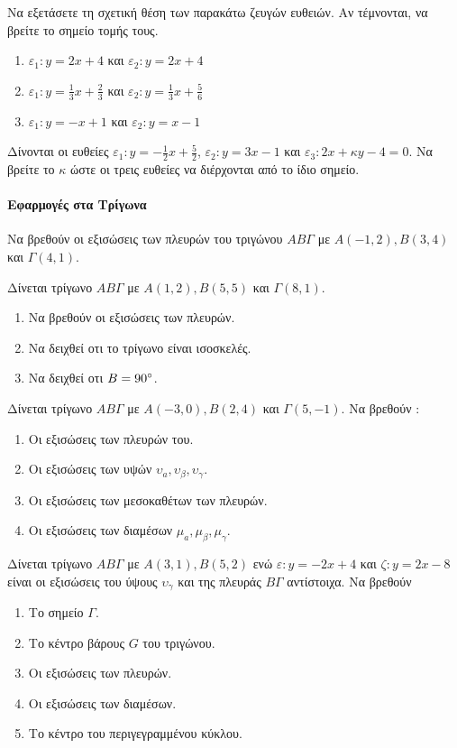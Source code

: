 \documentclass[11pt,a4paper,modern]{FFExercises}
\begin{document}
\askhsh
Να εξετάσετε τη σχετική θέση των παρακάτω ζευγών ευθειών. Αν τέμνονται, να βρείτε το σημείο τομής τους.
\begin{enumerate}[itemsep=0mm,label=\alph*.]
	\item $ \varepsilon_1: y = 2x + 4 $ και $ \varepsilon_2: y = 2x + 4 $
	\item $ \varepsilon_1: y = \frac{1}{3}x + \frac{2}{3} $ και $ \varepsilon_2: y = \frac{1}{3}x + \frac{5}{6} $
	\item $ \varepsilon_1: y = -x + 1 $ και $ \varepsilon_2: y = x - 1 $
\end{enumerate}

\askhsh
Δίνονται οι ευθείες $ \varepsilon_1: y = -\frac{1}{2}x + \frac{5}{2} $, $ \varepsilon_2: y = 3x - 1 $ και $ \varepsilon_3: 2x + \kappa y - 4 = 0 $. Να βρείτε το $\kappa$ ώστε οι τρεις ευθείες να διέρχονται από το ίδιο σημείο.

\paragraph{Εφαρμογές στα Τρίγωνα}
\askhsh
Να βρεθούν οι εξισώσεις των πλευρών του τριγώνου $ AB\varGamma $ με $ A(-1,2),B(3,4) $ και $ \varGamma(4,1) $.

\askhsh
Δίνεται τρίγωνο $ AB\varGamma $ με $ Α(1,2),Β(5,5) $ και $ \varGamma(8,1) $. 
\begin{enumerate}[itemsep=0mm,label=\alph*.]
	\item Να βρεθούν οι εξισώσεις των πλευρών.
	\item Να δειχθεί οτι το τρίγωνο είναι ισοσκελές.
	\item Να δειχθεί οτι $ B=90\degree $.
\end{enumerate}

\askhsh
Δίνεται τρίγωνο $ AB\varGamma $ με $ A(-3,0), B(2,4) $ και $ \varGamma(5,-1) $. Να βρεθούν :
\begin{enumerate}[itemsep=0mm,label=\alph*.]
	\item Οι εξισώσεις των πλευρών του.
	\item Οι εξισώσεις των υψών $ \upsilon_a,\upsilon_\beta, \upsilon_\gamma $.
	\item Οι εξισώσεις των μεσοκαθέτων των πλευρών.
	\item Οι εξισώσεις των διαμέσων $ \mu_a, \mu_\beta, \mu_\gamma $.
\end{enumerate}

\askhsh
Δίνεται τρίγωνο $ AB\varGamma $ με $ A(3,1), B(5,2) $ ενώ $ \varepsilon : y = -2x + 4 $ και $ \zeta : y = 2x - 8 $ είναι οι εξισώσεις του ύψους $ \upsilon_\gamma $ και της πλευράς $ B\varGamma $ αντίστοιχα. Να βρεθούν
\begin{enumerate}[itemsep=0mm,label=\alph*.]
	\item Το σημείο $ \varGamma $.
	\item Το κέντρο βάρους $ G $ του τριγώνου.
	\item Οι εξισώσεις των πλευρών.
	\item Οι εξισώσεις των διαμέσων.
	\item Το κέντρο του περιγεγραμμένου κύκλου.
\end{enumerate}
\end{document}
